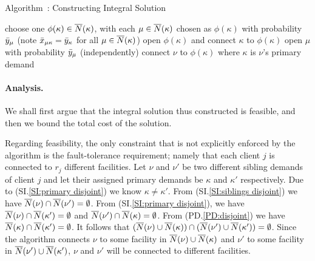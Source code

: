 \documentclass{llncs}
\begin{document}

\begin{algorithm}
  \caption{Algorithm~{\ECHS}:
    Constructing Integral Solution}
  \label{alg:lpr3}
  \begin{algorithmic}[1]
    \State choose one $\phi(\kappa)\in {\overline{N}}(\kappa)$,
    with each $\mu\in{\overline{N}}(\kappa)$ chosen as $\phi(\kappa)$
    with probability ${\bar y}_\mu$ (note {${\bar x}_{\mu\kappa} =
      {\bar y}_{\kappa}$ for all $\mu \in {\overline{N}}(\kappa)$})
    \State open $\phi(\kappa)$ and connect $\kappa$ to $\phi(\kappa)$
    \EndFor
    \State open $\mu$ with probability ${\bar y}_\mu$ (independently)
    \EndFor
    \Else
    \State connect $\nu$ to $\phi(\kappa)$ where $\kappa$ is $\nu$'s
     primary demand
    \EndIf
    \EndFor
  \end{algorithmic}
\end{algorithm}


\paragraph{Analysis.}
We shall first argue that the integral solution thus constructed is
feasible, and then we bound the total cost of the solution.

Regarding feasibility, the only constraint that is not explicitly
enforced by the algorithm is the fault-tolerance requirement; namely
that each client $j$ is connected to $r_j$ different facilities. Let
$\nu$ and $\nu'$ be two different sibling demands of client $j$ and
let their assigned primary demands be $\kappa$ and $\kappa'$
respectively. Due to (SI.\ref{SI:primary disjoint}) we know $\kappa
\neq \kappa'$. From (SI.\ref{SI:siblings disjoint}) we have
${\overline{N}}(\nu) \cap {\overline{N}}(\nu') = \emptyset$. From (SI.\ref{SI:primary
  disjoint}), we have ${\overline{N}}(\nu) \cap {\overline{N}}(\kappa') = \emptyset$
and ${\overline{N}}(\nu') \cap {\overline{N}}(\kappa) = \emptyset$. From
(PD.\ref{PD:disjoint}) we have ${\overline{N}}(\kappa)\cap {\overline{N}}(\kappa') =
\emptyset$. It follows that $({\overline{N}}(\nu) \cup {\overline{N}}(\kappa)) \cap
({\overline{N}}(\nu') \cup {\overline{N}}(\kappa')) = \emptyset$. Since the algorithm
connects $\nu$ to some facility in ${\overline{N}}(\nu) \cup {\overline{N}}(\kappa)$
and $\nu'$ to some facility in ${\overline{N}}(\nu') \cup {\overline{N}}(\kappa')$,
$\nu$ and $\nu'$ will be connected to different facilities. 
\end{document}
